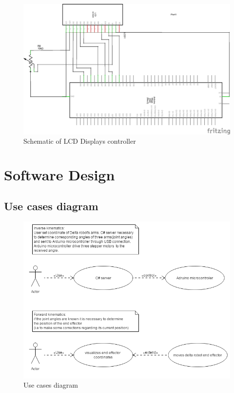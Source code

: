 \begin{figure}[H]
	\centering
	\includegraphics[width=\maxwidth{15cm}, keepaspectratio]{Chapters/Fig/Deltarobot_LCD_16x2_schem.png}
	\caption{Schematic of LCD Displays controller}
	\label{fig:Deltarobot_LCD_16x2_schem}
\end{figure}
\section{Software Design}

\subsection{Use cases diagram}
\begin{figure}[H]
	\centering
	\includegraphics[width=\maxwidth{15cm}, keepaspectratio]{Chapters/Fig/use_case_diagram.png}
	\caption{Use cases diagram}
	\label{fig:use_case_diagram}
\end{figure}

